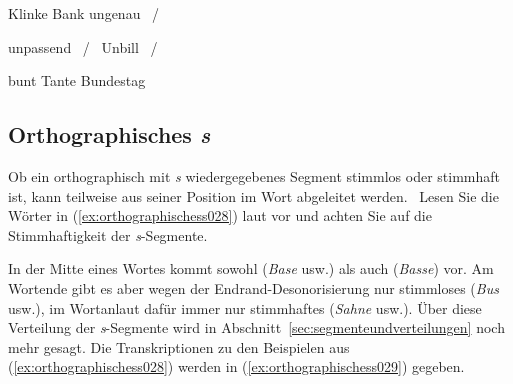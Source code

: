\begin{exe}
    \ex\label{ex:orthographischesn025}
    \begin{xlist}
      \ex Klinke \textipa{[klINk@]}
      \ex Bank \textipa{[baNk]}
      \ex ungenau \textipa{[PUng@n\t{aO}]}~\slash~\textipa{[PUNg@n\t{aO}]}
    \end{xlist}
    \ex\label{ex:orthographischesn026}
    \begin{xlist}
      \ex unpassend \textipa{[PUmpas@nt]}~\slash~\textipa{[PUnpas@nt]}
      \ex Unbill \textipa{[PUmbIl]}~\slash~\textipa{[PUnbIl]}
    \end{xlist}
    \ex\label{ex:orthographischesn027}
    \begin{xlist}
      \ex bunt \textipa{[bUnt]}
      \ex Tante \textipa{[tant@]}
      \ex Bundestag 
    \end{xlist}
\end{exe}

\subsection{Orthographisches \textit{s}}
\label{sec:orthographischess}

Ob ein orthographisch mit \textit{s} wiedergegebenes Segment stimmlos \textipa{[s]} oder stimmhaft \textipa{[z]} ist, kann teilweise aus seiner Position im Wort abgeleitet werden.
\TuBegin~Lesen Sie die Wörter in (\ref{ex:orthographischess028}) laut vor und achten Sie auf die Stimmhaftigkeit der \textit{s}-Segmente.

\begin{exe}
  \ex\label{ex:orthographischess028}
  \begin{xlist}
  \end{xlist}
\end{exe}

In der Mitte eines Wortes kommt sowohl \textipa{[z]} (\textit{Base} usw.) als auch \textipa{[s]} (\textit{Basse}) vor.
Am Wortende gibt es aber wegen der Endrand-Desonorisierung nur stimmloses \textipa{[s]} (\textit{Bus} usw.), im Wortanlaut dafür immer nur stimmhaftes \textipa{[z]} (\textit{Sahne} usw.).
Über diese Verteilung der \textit{s}-Segmente wird in Abschnitt~\ref{sec:segmenteundverteilungen} noch mehr gesagt.
Die Transkriptionen zu den Beispielen aus (\ref{ex:orthographischess028}) werden in (\ref{ex:orthographischess029}) gegeben.

